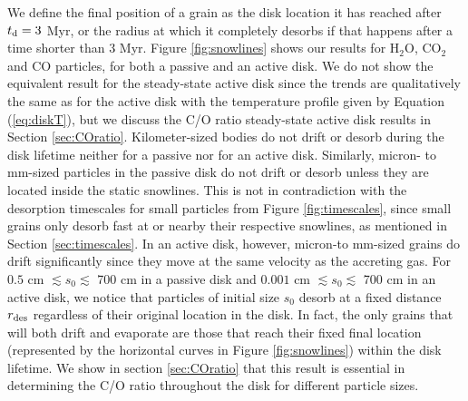 \documentclass[apj]{emulateapj}
\begin{document}
We define the final position of a grain as the disk location it has reached after $t_{\rm d}=3$ Myr, or the radius at which it completely desorbs if that happens after a time shorter than 3 Myr.  Figure \ref{fig:snowlines} shows our results for H$_2$O, CO$_2$ and CO particles, for both a passive and an active disk. We do not show the equivalent result for the steady-state active disk since the trends are qualitatively the same as for the active disk with the temperature profile given by Equation (\ref{eq:diskT}), but we discuss the C/O ratio steady-state active disk results in Section \ref{sec:COratio}.   Kilometer-sized bodies do not drift or desorb during the disk lifetime neither for a passive nor for an active disk. Similarly, micron- to mm-sized particles in the passive disk do not drift or desorb unless they are located inside the static snowlines. This is not in contradiction with the desorption timescales for small particles from Figure \ref{fig:timescales}, since small grains only desorb fast at or nearby their respective snowlines, as mentioned in Section \ref{sec:timescales}.  In an active disk, however, micron-to mm-sized grains do drift significantly since they move at the same velocity as the accreting gas. For $0.5$ cm $\lesssim s_0 \lesssim$ 700 cm in a passive disk and $0.001$ cm $\lesssim s_0 \lesssim$ 700 cm in an active disk, we notice that particles of initial size $s_0$ desorb at a fixed distance $r_{\rm des}$ regardless of their original location in the disk. In fact, the only grains that will both drift and evaporate are those that reach their fixed final location (represented by the horizontal curves in Figure \ref{fig:snowlines}) within the disk lifetime. We show in section \ref{sec:COratio} that this result is essential in determining the C/O ratio throughout the disk for different particle sizes. 
\end{document}
